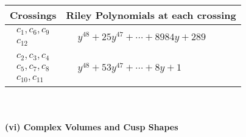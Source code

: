 \documentclass[1p]{elsarticle_modified}
\theoremstyle{definition}
\begin{document}
\begin{tabular}{m{50pt}|m{274pt}}
Crossings & \hspace{64pt}Riley Polynomials at each crossing \\
\hline $$\begin{aligned}c_{1},c_{6},c_{9}\\c_{12}\end{aligned}$$&$\begin{aligned}
&y^{48}+25 y^{47}+\cdots+8984 y+289
\end{aligned}$\\
\hline $$\begin{aligned}c_{2},c_{3},c_{4}\\c_{5},c_{7},c_{8}\\c_{10},c_{11}\end{aligned}$$&$\begin{aligned}
&y^{48}+53 y^{47}+\cdots+8 y+1
\end{aligned}$\\
\hline
\end{tabular}\\~\\
\newpage\flushleft \textbf{(vi) Complex Volumes and Cusp Shapes}
\end{document}

